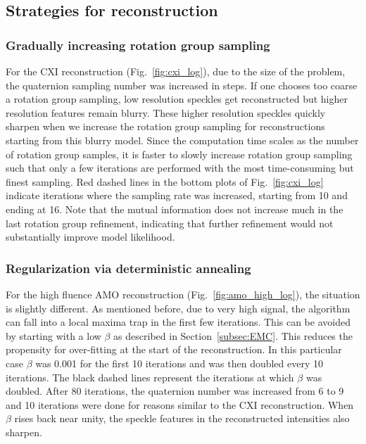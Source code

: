 \documentclass[]{iucr}              %
\begin{document}
\subsection{Strategies for reconstruction} \label{subsec:strategy}

\subsubsection{Gradually increasing rotation group sampling} \label{subsec:quatRefine}
For the CXI reconstruction (Fig.~\ref{fig:cxi_log}), due to the size of the problem, the quaternion sampling number was increased in steps. If one chooses too coarse a rotation group sampling, low resolution speckles get reconstructed but higher resolution features remain blurry. These higher resolution speckles quickly sharpen when we increase the rotation group sampling for reconstructions starting from this blurry model. Since the computation time scales as the number of rotation group samples, it is faster to slowly increase rotation group sampling such that only a few iterations are performed with the most time-consuming but finest sampling. Red dashed lines in the bottom plots of Fig.~\ref{fig:cxi_log} indicate iterations where the sampling rate was increased, starting from 10 and ending at 16. Note that the mutual information does not increase much in the last rotation group refinement, indicating that further refinement would not substantially improve model likelihood.

\subsubsection{Regularization via deterministic annealing} \label{subsec:regularization}
For the high fluence AMO reconstruction (Fig.~\ref{fig:amo_high_log}), the situation is slightly different. As mentioned before, due to very high signal, the algorithm can fall into a local maxima trap in the first few iterations. This can be avoided by starting with a low $\beta$ as described in Section~\ref{subsec:EMC}. This reduces the propensity for over-fitting at the start of the reconstruction. In this particular case $\beta$ was 0.001 for the first 10 iterations and was then doubled every 10 iterations. The black dashed lines represent the iterations at which $\beta$ was doubled. After 80 iterations, the quaternion number was increased from 6 to 9 and 10 iterations were done for reasons similar to the CXI reconstruction. When $\beta$ rises back near unity, the speckle features in the reconstructed intensities also sharpen.
\end{document}
